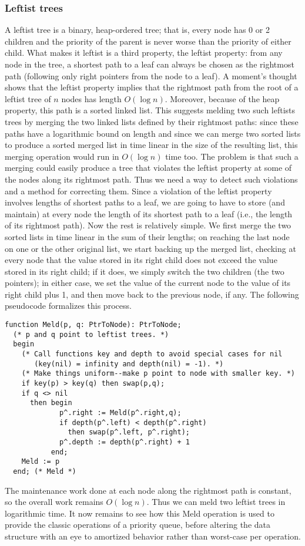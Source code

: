 \documentclass[11pt]{article}
\begin{document}
\subsubsection{Leftist trees}
A leftist tree is a binary, heap-ordered tree; that is, every node has 0 or 2
children and the priority of the parent is never worse than the priority of
either child.  What makes it leftist is a third property, the leftist property:
from any node in the tree, a shortest path to a leaf can always be chosen as
the rightmost path (following only right pointers from the node to a leaf).
A moment's thought shows that the leftist property implies that the rightmost
path from the root of a leftist tree of $n$ nodes has length $O(\log n)$.
Moreover, because of the heap property, this path is a sorted linked list.
This suggests melding two such leftists trees by merging the two linked lists
defined by their rightmost paths: since these paths have a logarithmic bound
on length and since we can merge two sorted lists to produce a sorted merged
list in time linear in the size of the resulting list, this merging operation
would run in $O(\log n)$ time too.  The problem is that such a merging could
easily produce a tree that violates the leftist property at some of the nodes
along its rightmost path.  Thus we need a way to detect such violations
and a method for correcting them.  Since a violation of the leftist property
involves lengths of shortest paths to a leaf, we are going to have to store
(and maintain) at every node the length of its shortest path to a leaf (i.e.,
the length of its rightmost path).  Now the rest is relatively simple.
We first merge the two sorted lists in time linear in the sum of their lengths;
on reaching the last node on one or the other original list, we start backing
up the merged list, checking at every node that the value stored in its
right child does not exceed the value stored in its right child; if it does,
we simply switch the two children (the two pointers); in either case, we set
the value of the current node to the value of its right child plus 1, and
then move back to the previous node, if any.  The following pseudocode
formalizes this process.
\begin{verbatim}
function Meld(p, q: PtrToNode): PtrToNode;
  (* p and q point to leftist trees. *)
  begin
    (* Call functions key and depth to avoid special cases for nil
       (key(nil) = infinity and depth(nil) = -1). *)
    (* Make things uniform--make p point to node with smaller key. *)
    if key(p) > key(q) then swap(p,q);
    if q <> nil
      then begin
             p^.right := Meld(p^.right,q);
             if depth(p^.left) < depth(p^.right)
               then swap(p^.left, p^.right);
             p^.depth := depth(p^.right) + 1
           end;
    Meld := p
  end; (* Meld *)
\end{verbatim}
The maintenance work done
at each node along the rightmost path is constant, so the overall work
remains $O(\log n)$.  Thus we can meld two leftist trees in logarithmic time.
It now remains to see how this {\sc Meld} operation is used to provide
the classic operations of a priority queue, before altering the data
structure with an eye to amortized behavior rather than worst-case per
operation.
\end{document}
